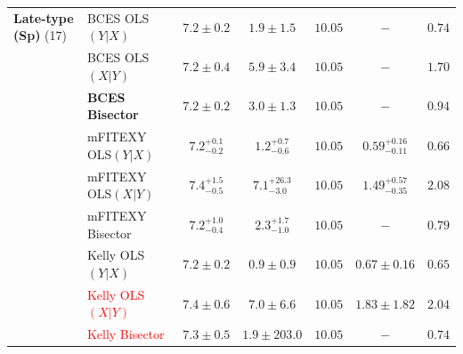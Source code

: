 \documentclass[preprint2]{emulateapj}
\begin{document}
\begin{table}
\begin{tabular}{llccccc}
{\bf Late-type (Sp)} (17)    & BCES OLS$(Y|X)$    & $7.2 \pm 0.2$ & $1.9 \pm 1.5$ & $10.05$ & $-$ & $0.74$ \\ 
                             & BCES OLS$(X|Y)$    & $7.2 \pm 0.4$ & $5.9 \pm 3.4$ & $10.05$ & $-$ & $1.70$ \\
                             & {\bf BCES Bisector}& $\boldsymbol{7.2 \pm 0.2}$ & $\boldsymbol{3.0 \pm 1.3}$ & $\boldsymbol{10.05}$ & $-$ & $\boldsymbol{0.94}$ \\
                             & mFITEXY OLS$(Y|X)$  & $7.2^{+0.1}_{-0.2}$ & $1.2^{+0.7}_{-0.6}$ & $10.05$ & $0.59^{+0.16}_{-0.11}$ & $0.66$ \\
                             & mFITEXY OLS$(X|Y)$  & $7.4^{+1.5}_{-0.5}$ & $7.1^{+26.3}_{-3.0}$ & $10.05$ & $1.49^{+0.57}_{-0.35}$ & $2.08$ \\
                             & mFITEXY Bisector    & $7.2^{+1.0}_{-0.4}$ & $2.3^{+1.7}_{-1.0}$ & $10.05$ & $-$    & $0.79$ \\
                             & Kelly OLS$(Y|X)$  & $7.2 \pm 0.2$ & $0.9 \pm 0.9$ & $10.05$ & $0.67 \pm 0.16$ & $0.65$ \\
                             & \textcolor{red}{Kelly OLS$(X|Y)$}  & $7.4 \pm 0.6$ & $7.0 \pm 6.6$ & $10.05$ & $1.83 \pm 1.82$ & $2.04$ \\
                             & \textcolor{red}{Kelly Bisector}    & $7.3 \pm 0.5$ & $1.9 \pm 203.0$ & $10.05$ & $-$    & $0.74$ \\
                  
\hline 
\hline
\end{tabular}
\label{tab:lreg} 
\end{table}
\end{document}
